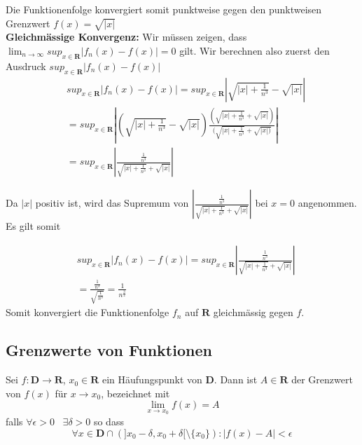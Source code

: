 \documentclass[8pt]{article}
\begin{document}
\begin{multicols*}{3}
$$$$
Die Funktionenfolge konvergiert somit punktweise gegen den punktweisen Grenzwert $f(x) = \sqrt{|x|}$\\
\textbf{Gleichmässige Konvergenz:} Wir müssen zeigen, dass $\lim_{n \to \infty} sup_{x \in \mathbf{R}} |f_n(x) - f(x)| = 0$ gilt. Wir berechnen also zuerst den Ausdruck $sup_{x \in \mathbf{R}} |f_n(x) - f(x)|$
\begin{align*}
	&sup_{x \in \mathbf{R}} |f_n(x) - f(x)| = sup_{x \in \mathbf{R}} |\sqrt{|x| + \frac{1}{n^3}} - \sqrt{|x|}|\\
	& =  sup_{x \in \mathbf{R}} |(\sqrt{|x| + \frac{1}{n^3}} - \sqrt{|x|}) \frac{(\sqrt{|x| + \frac{1}{n^3}} + \sqrt{|x|})}{(\sqrt{|x| + \frac{1}{n^3}} + \sqrt{|x|)}}| \\
	& = sup_{x \in \mathbf{R}} |\frac{\frac{1}{n^3}}{\sqrt{|x| + \frac{1}{n^3}} + \sqrt{|x|}}|
\end{align*}

Da $|x|$ positiv ist, wird das Supremum von $|\frac{\frac{1}{n^3}}{\sqrt{|x| + \frac{1}{n^3}} + \sqrt{|x|}}|$ bei $x = 0$ angenommen. Es gilt somit

\begin{align*}
	& sup_{x \in \mathbf{R}} |f_n(x) - f(x)| = sup_{x \in \mathbf{R}} |\frac{\frac{1}{n^3}}{\sqrt{|x| + \frac{1}{n^3}} + \sqrt{|x|}}|\\
 	&= \frac{\frac{1}{n^3}}{\sqrt{\frac{1}{n^3}}} = \frac{1}{n^{\frac{3}{2}}}
\end{align*}
Somit konvergiert die Funktionenfolge $f_n$ auf $\mathbf{R}$ gleichmässig gegen $f$.




  \subsection {Grenzwerte von Funktionen}
Sei $f:\mathbf{D} \rightarrow \mathbf{R}$, $x_0 \in \mathbf{R}$ ein Häufungspunkt von $\mathbf{D}$.
Dann ist $A \in \mathbf{R}$ der Grenzwert von $f(x)$ für $x \rightarrow x_0$, bezeichnet mit
$$
  \lim_{x \rightarrow x_0} f(x) = A
$$
falls $\forall \epsilon > 0 \;\;\; \exists \delta > 0$ so dass
$$
  \forall x \in \mathbf{D} \cap (]x_0-\delta, x_0 + \delta[ \setminus \{x_0\}) : |f(x) - A| < \epsilon
$$

\end{multicols*}
\end{document}

